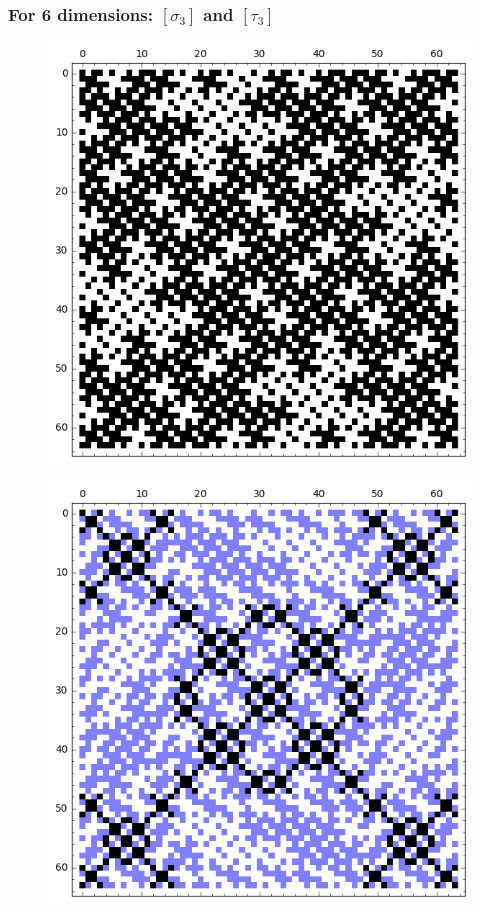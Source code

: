 \documentclass[pdf,sprung,slideColor,nocolorBG]{beamer}
\newenvironment{colortheme}[1]{
\def\ProvidesPackageRCS $##1${\relax}
\renewcommand{\ProcessOptions}{\relax}
\makeatletter

\makeatother
}{}
\begin{document}
\begin{colortheme}{jubata}
\begin{frame}
\frametitle{For 6 dimensions: $[\sigma_3]$ and $[\tau_3]$}
\begin{figure}
\centering
\begin{minipage}{.48\textwidth}
  \centering
  \includegraphics[width=.9\linewidth]{../matrix_plot/sigma_3_bent_cayley_graph_index_matrix.png}
  \label{fig:sigma_3_bent_cayley_graph_index_matrix}
\end{minipage}%
\begin{minipage}{.48\textwidth}
  \centering
  \includegraphics[width=.9\linewidth]{../matrix_plot/tau_3_bent_cayley_graph_index_matrix.png}
  \label{fig:tau_3_bent_cayley_graph_index_matrix}
\end{minipage}
\end{figure}
\end{frame}


\end{colortheme}
\end{document}
